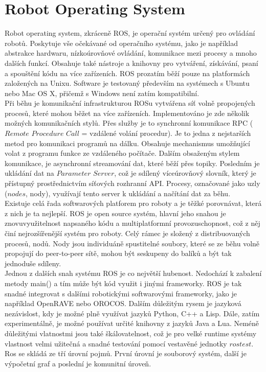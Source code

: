 \documentclass[12pt]{report}
\begin{document}
\section{Robot Operating System}
Robot operating system, zkráceně ROS, je operační systém určený pro ovládání robotů. Poskytuje vše očekávané od operačního systému, jako je například abstrakce hardwaru, nízkoúrovňové ovládání, komunikace mezi procesy a mnoho dalších funkcí. Obsahuje také nástroje a knihovny pro vytváření, získávání, psaní a spouštění kódu na více zařízeních. ROS prozatím běží pouze na platformách založených na Unixu. Software je testovaný především na systémech s Ubuntu nebo Mac OS X, přičemž s Windows není zatím kompatibilní.\\
\indent Při běhu je komunikační infrastrukturou ROSu vytvářena síť volně propojených procesů, které mohou běžet na více zařízeních. Implementováno je zde několik možných komunikačních stylů. Přes služby je to synchronní komunikace RPC ($Remote$ $Procedure$ $Call$ = vzdálené volání procedur). Je to jedna z nejstarších metod pro komunikaci programů na dálku. Obsahuje mechanismus umožňující volat z programu funkce ze vzdáleného počítače. Dalším obsaženým stylem komunikace, je asynchronní streamování dat, které běží přes topiky. Posledním je ukládání dat na $Parameter$ $Server$, což je sdílený víceúrovňový slovník, který je přístupný prostřednictvím síťových rozhranní API. Procesy, označované jako uzly ($nodes$, nody), využívají tento server k ukládání a načítání dat za běhu.\\
\indent Existuje celá řada softwarových platforem pro roboty a je těžké porovnávat, která z nich je ta nejlepší. ROS je open source systém, hlavní jeho snahou je znovuvyužitelnost napsaného kódu a multiplatformní provozuschopnost, což z něj činí nejrozšířenější systém pro roboty. Celý rámec je složený z distribuovaných procesů, nodů. Nody jsou individuáně spustitelné soubory, které se ze běhu volně propojují do peer-to-peer sítě, mohou být seskupeny do balíků a být tak jednoduše sdíleny.\\
\indent Jednou z dalších snah systému ROS je co největší hubenost. Nedochází k zabalení metody main() a tím může být kód využit i jinými frameworky. ROS je tak snadné integrovat s dalšími robotickými softwarovými frameworky, jako je například OpenRAVE nebo OROCOS. Dalším důležitým rysem je jazyková nezávislost, kdy je možné plně využívat jazyků Python, C++ a Lisp. Dále, zatím experimentálně, je možné používat určité knihovny z jazyků Java a Lua. Neméně důležitými vlatnostmi jsou také škálovatelnost, což je pro velké runtime systémy vlastnost velmi užitečná a snadné testování pomocí vestavěné jednotky $rostest$.\\
\indent Ros se skládá ze tří úrovní pojmů. První úrovní je souborový systém, další je výpočetní graf a poslední je komunitní úroveň.\\
\end{document}
